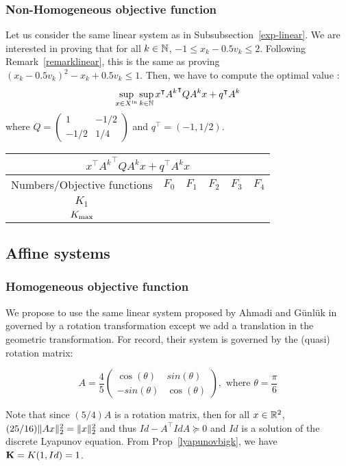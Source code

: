 \documentclass[10pt]{article}
\begin{document}
\subsubsection{Non-Homogeneous objective function}
Let us consider the same linear system as in Subsubsection~\ref{exp-linear}. We are interested in proving that for all $k\in\mathbb{N}$, $-1\leq x_k-0.5v_k\leq 2$. Following Remark~\ref{remarklinear}, this is the same as proving $(x_k-0.5 v_k)^2-x_k+0.5 v_k\leq 1$. Then, we have to compute the optimal value :
\[
\sup_{x\in X^\mathrm{in}} \sup_{k\in\mathbb{N}} x^\intercal {A^k}^\intercal Q A^k x+q^\intercal A^k  
\]
where $Q=\begin{pmatrix} 1 & -1/2 \\ -1/2 & 1/4\end{pmatrix}$ and $q^\intercal=(-1,1/2)$. 
\begin{center}
\begin{tabular}{|c|c|c|c|c|c|}
\hline
\multicolumn{6}{|c|}{$x^\intercal {A^k}^\intercal Q A^k x+q^\intercal A^k x$}\\
\hline
Numbers/Objective functions & $F_0$ & $F_{1}$ & $F_{2}$ & $F_3$ & $F_4$ \\
\hline
$K_1$ & & & & & \\
\hline
 $K_{\rm max}$ & & & & & \\
\hline
\end{tabular}
\end{center}
\subsection{Affine systems}

\subsubsection{Homogeneous objective function}

We propose to use the same linear system proposed by Ahmadi and G\"unl\"uk in~\cite{ahmadi2018robust} governed by a rotation transformation except we add a translation in the geometric transformation. For record, their system is governed by the (quasi) rotation matrix:

\[
A=
 \dfrac{4}{5}\begin{pmatrix}
 \cos(\theta)& sin(\theta)\\
-sin(\theta) & \cos(\theta)
\end{pmatrix},\text{ where }\theta=\dfrac{\pi}{6}
\]

Note that since $(5/4)A$ is a rotation matrix, then for all $x\in\mathbb R^2$,
$(25/16)\| Ax\|_2^2=\| x\|_2^2$ and thus $Id-A^\intercal Id A\succeq 0$ and $Id$ is a solution of the discrete Lyapunov equation. From Prop~\ref{lyapunovbigk}, we have $\mathbf{K}=K(1,Id)=1$. 
  
\end{document}
